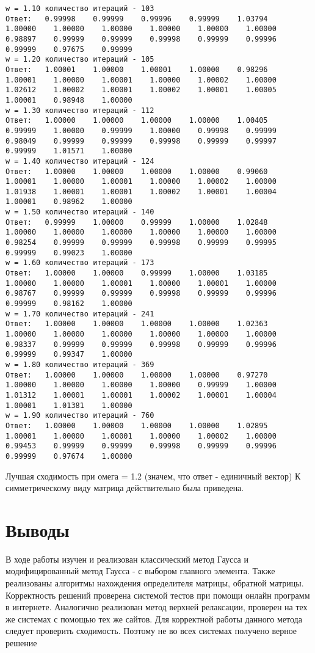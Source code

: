 \documentclass[a4paper,12pt,titlepage,finall]{article}
\begin{document}
\begin{verbatim}
w = 1.10 количество итераций - 103
Ответ:   0.99998    0.99999    0.99996    0.99999    1.03794    1.00000    1.00000    1.00000    1.00000    1.00000    1.00000    0.98897    0.99999    0.99999    0.99998    0.99999    0.99996    0.99999    0.97675    0.99999 
w = 1.20 количество итераций - 105
Ответ:   1.00001    1.00000    1.00001    1.00000    0.98296    1.00001    1.00000    1.00001    1.00000    1.00002    1.00000    1.02612    1.00002    1.00001    1.00002    1.00001    1.00005    1.00001    0.98948    1.00000 
w = 1.30 количество итераций - 112
Ответ:   1.00000    1.00000    1.00000    1.00000    1.00405    0.99999    1.00000    0.99999    1.00000    0.99998    0.99999    0.98049    0.99999    0.99999    0.99998    0.99999    0.99997    0.99999    1.01571    1.00000 
w = 1.40 количество итераций - 124
Ответ:   1.00000    1.00000    1.00000    1.00000    0.99060    1.00001    1.00000    1.00001    1.00000    1.00002    1.00000    1.01938    1.00001    1.00001    1.00002    1.00001    1.00004    1.00001    0.98962    1.00000 
w = 1.50 количество итераций - 140
Ответ:   0.99999    1.00000    0.99999    1.00000    1.02848    1.00000    1.00000    1.00000    1.00000    1.00000    1.00000    0.98254    0.99999    0.99999    0.99998    0.99999    0.99995    0.99999    0.99023    1.00000 
w = 1.60 количество итераций - 173
Ответ:   1.00000    1.00000    0.99999    1.00000    1.03185    1.00000    1.00000    1.00001    1.00000    1.00001    1.00000    0.98767    0.99999    0.99999    0.99998    0.99999    0.99996    0.99999    0.98162    1.00000 
w = 1.70 количество итераций - 241
Ответ:   1.00000    1.00000    1.00000    1.00000    1.02363    1.00000    1.00000    1.00000    1.00000    1.00000    1.00000    0.98337    0.99999    0.99999    0.99998    0.99999    0.99996    0.99999    0.99347    1.00000 
w = 1.80 количество итераций - 369
Ответ:   1.00000    1.00000    1.00000    1.00000    0.97270    1.00000    1.00000    1.00000    1.00000    0.99999    1.00000    1.01312    1.00001    1.00001    1.00002    1.00001    1.00004    1.00001    1.01381    1.00000 
w = 1.90 количество итераций - 760
Ответ:   1.00000    1.00000    1.00000    1.00000    1.02895    1.00001    1.00000    1.00001    1.00000    1.00002    1.00000    0.99453    0.99999    0.99999    0.99998    0.99999    0.99996    0.99999    0.97674    1.00000
\end{verbatim}

Лучшая сходимость при омега = 1.2 (значем, что ответ - единичный вектор)
К симметрическому виду матрица действительно была приведена.

\newpage

\section{Выводы}
В ходе работы изучен и реализован классический метод Гаусса и модифицированный метод Гаусса - с выбором главного элемента. Также реализованы алгоритмы нахождения определителя матрицы, обратной матрицы. Корректность решений проверена системой тестов при помощи онлайн программ в интернете.
Аналогично реализован метод верхней релаксации, проверен на тех же системах с помощью тех же сайтов. Для корректной работы данного метода следует проверить сходимость. Поэтому не во всех системах получено верное решение
\end{document}

